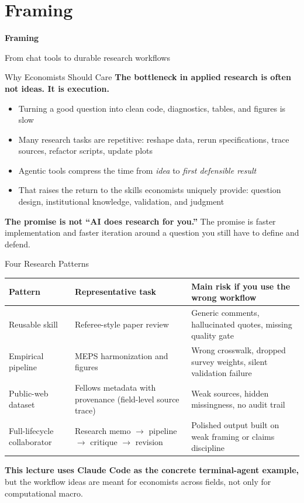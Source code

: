 \documentclass[10pt,english,aspectratio=169]{beamer}
\newcommand{\sectiondivider}[2]{%
\begin{frame}[plain,noframenumbering]
\begin{center}
\vfill
{\Large\textbf{#1}\par}
\vspace{0.35cm}
{\normalsize #2\par}
\vfill
\end{center}
\end{frame}
}
\begin{document}
\section{Framing}

\sectiondivider{Framing}{From chat tools to durable research workflows}

\begin{frame}{Why Economists Should Care}
\textbf{The bottleneck in applied research is often not ideas. It is execution.}

\vspace{0.3cm}

\begin{itemize}
    \item Turning a good question into clean code, diagnostics, tables, and figures is slow
    \item Many research tasks are repetitive: reshape data, rerun specifications, trace sources, refactor scripts, update plots
    \item Agentic tools compress the time from \textit{idea} to \textit{first defensible result}
    \item That raises the return to the skills economists uniquely provide: question design, institutional knowledge, validation, and judgment
\end{itemize}

\vspace{0.3cm}

\textbf{The promise is not ``AI does research for you.''} The promise is faster implementation and faster iteration around a question you still have to define and defend.
\end{frame}

\begin{frame}{Four Research Patterns}
\small
\begin{tabular}{p{2.55cm}p{3.3cm}p{5.4cm}}
\toprule
\textbf{Pattern} & \textbf{Representative task} & \textbf{Main risk if you use the wrong workflow} \\
\midrule
Reusable skill & Referee-style paper review & Generic comments, hallucinated quotes, missing quality gate \\
Empirical pipeline & MEPS harmonization and figures & Wrong crosswalk, dropped survey weights, silent validation failure \\
Public-web dataset & Fellows metadata with provenance (field-level source trace) & Weak sources, hidden missingness, no audit trail \\
Full-lifecycle collaborator & Research memo $\rightarrow$ pipeline $\rightarrow$ critique $\rightarrow$ revision & Polished output built on weak framing or claims discipline \\
\bottomrule
\end{tabular}

\vspace{0.28cm}
\textbf{This lecture uses Claude Code as the concrete terminal-agent example,} but the workflow ideas are meant for economists across fields, not only for computational macro.
\end{frame}
\end{document}
